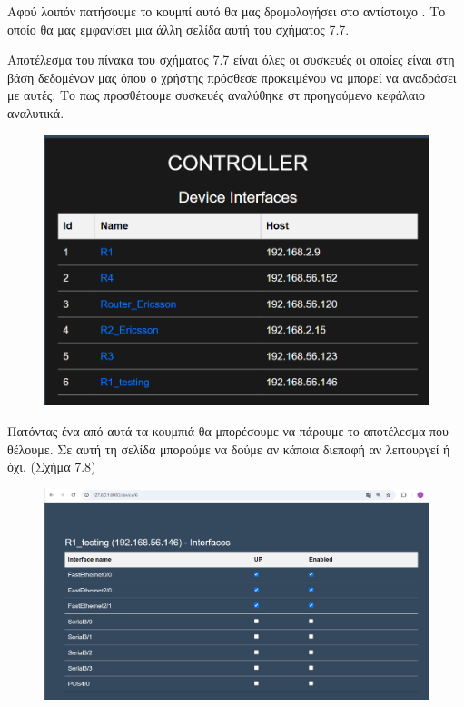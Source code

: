 \FloatBarrier

Αφού λοιπόν πατήσουμε το κουμπί  αυτό θα μας δρομολογήσει στο αντίστοιχο .
Το οποίο θα μας εμφανίσει μια άλλη σελίδα αυτή του σχήματος 7.7. 

Αποτέλεσμα του πίνακα του σχήματος 7.7 είναι όλες οι συσκευές οι οποίες
είναι στη βάση δεδομένων μας όπου ο χρήστης πρόσθεσε προκειμένου
να μπορεί να αναδράσει με αυτές. Το πως προσθέτουμε συσκευές αναλύθηκε στ προηγούμενο κεφάλαιο αναλυτικά.

\FloatBarrier
\begin{figure}[htb]
	\centering
	\includegraphics[width=1.2\textwidth]{graphics/device_interfaces.png}
	\caption{}
\end{figure}

\FloatBarrier

Πατόντας ένα από αυτά τα κουμπιά θα μπορέσουμε να πάρουμε το αποτέλεσμα που θέλουμε.
Σε αυτή τη σελίδα μπορούμε να δούμε αν κάποια διεπαφή αν λειτουργεί ή όχι.
(Σχήμα 7.8)

\FloatBarrier
\begin{figure}[htb]
	\centering
	\includegraphics[width=1.2\textwidth]{graphics/interfaces.png}
	\caption{}
\end{figure}
\FloatBarrier


